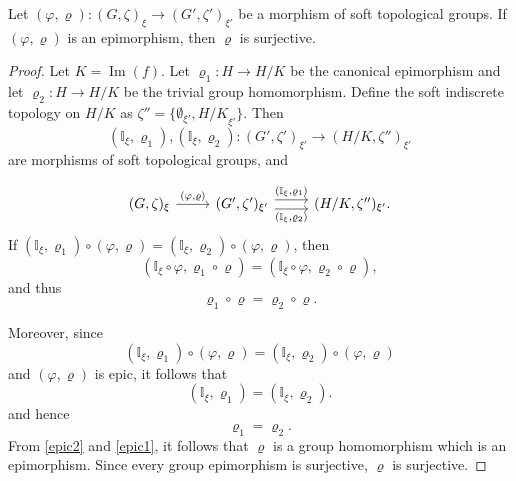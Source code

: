\documentclass[preprint,12pt]{elsarticle}
\begin{document}
\begin{prop}
Let   $(\varphi,\varrho) : (G,\zeta)_\xi  \to ( G',\zeta')_{\xi'}$
  be a morphism of soft topological groups.
If $(\varphi, \varrho)$ is an epimorphism, then $\varrho$ is surjective.
\end{prop}

\begin{proof}
Let \( K = \operatorname{Im}(f) \). Let
\(\varrho_1: H \to H/K\) be the canonical epimorphism and let
\(\varrho_2: H \to H/K\) be the trivial group homomorphism. Define the soft indiscrete topology on \( H/K \) as
\(\zeta'' = \{ \emptyset_{\xi'}, {H/K}_{\xi'} \}.\)
Then
\[
(\mathbb{I}_\xi, \varrho_1),(\mathbb{I}_\xi, \varrho_2):( G',\zeta')_{\xi'} \to ( H/K, \zeta'')_{\xi'} \]
 are morphisms of soft topological groups, and

\[
\begin{tikzcd}
(G,\zeta)_\xi   \ar[r,"{(\varphi, \varrho)}"]& (G',\zeta')_{\xi'}  \ar[r,shift left=.75ex,"{(\mathbb{I}_\xi, \varrho_1)}"]
  \ar[r,shift right=.75ex,swap,"{(\mathbb{I}_\xi, \varrho_2 )}"]
& ( H/K, \zeta'')_{\xi'}.
\end{tikzcd}
\]
If \((\mathbb{I}_{\xi}, \varrho_1) \circ (\varphi, \varrho) = (\mathbb{I}_{\xi}, \varrho_2) \circ (\varphi, \varrho) \), then \[(\mathbb{I}_{\xi}\circ \varphi, \varrho_1\circ \varrho)  = (\mathbb{I}_{\xi} \circ \varphi,  \varrho_2\circ \varrho),\] and thus
 \begin{equation} \label{epic2}
\varrho_1\circ \varrho = \varrho_2\circ \varrho.
\end{equation}

Moreover, since
 \[
(\mathbb{I}_{\xi}, \varrho_1) \circ (\varphi, \varrho) = (\mathbb{I}_{\xi}, \varrho_2) \circ (\varphi, \varrho)
\] and  \((\varphi, \varrho)\) is epic, it follows that  \[
(\mathbb{I}_{\xi}, \varrho_1)  = (\mathbb{I}_{\xi}, \varrho_2).
\]
and hence
\begin{equation} \label{epic1}
\varrho_1 = \varrho_2.
\end{equation}
From \eqref{epic2}  and \eqref{epic1}, it follows that \( \varrho \) is a group homomorphism which is an epimorphism.
Since every group epimorphism is surjective, \( \varrho \) is surjective.
\end{proof}
\end{document}
